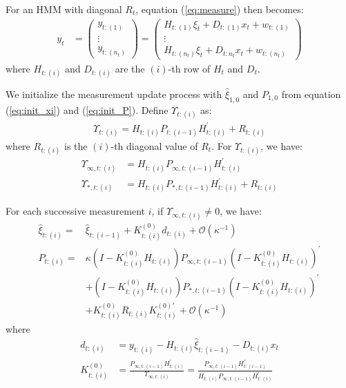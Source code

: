 \documentclass[12pt]{article}
\numberwithin{equation}{section}
\begin{document}
For an HMM with diagonal $R_t$, equation (\ref{eq:measure}) then becomes:
\begin{align*}
    y_t &= 
    \begin{pmatrix}
        y_{t:(1)} \\
        \vdots \\ 
        y_{t:(n_t)}
    \end{pmatrix} 
    = \begin{pmatrix}
        H_{t:(1)}\xi_t + D_{t:(1)}x_t + w_{t:(1)} \\
        \vdots \\
        H_{t:(n_t)}\xi_t + D_{t:n_t}x_t + w_{t:(n_t)}
    \end{pmatrix}
\end{align*}
where $H_{t:(i)}$ and $D_{t:(i)}$ are the $(i)$-th row of $H_t$ and $D_t$. 

We initialize the measurement update process with $\hat{\xi}_{1,0}$ and $P_{1,0}$ from equation (\ref{eq:init_xi}) and (\ref{eq:init_P}). Define $\Upsilon_{t:(i)}$ as:
\begin{align*}
    \Upsilon_{t:(i)} = H_{t:(i)}P_{t:(i-1)}H_{t:(i)}^{'} + R_{t:(i)}
\end{align*}
where $R_{t:(i)}$ is the $(i)$-th diagonal value of $R_{t}$. For $\Upsilon_{t:(i)}$, we have:
\begin{align*}
    \Upsilon_{\infty, t:(i)} &= H_{t:(i)}P_{\infty, t:(i-1)}H_{t:(i)}^{'} \\
    \Upsilon_{*,t:(i)} &= H_{t:(i)}P_{*,t:(i-1)}H_{t:(i)}^{'} + R_{t:(i)}
\end{align*}

For each successive measurement $i$, if $\Upsilon_{\infty,t:(i)}\neq0$, we have:
\begin{align}
    \hat{\xi}_{t:(i)} = & \hat{\xi}_{t:(i-1)} + K_{t:(i)}^{(0)}d_{t:(i)} + \mathcal{O}(\kappa^{-1}) \label{eq:diff_seq_xi1} \\
    P_{t:(i)} =& \kappa(I-K_{t:(i)}^{(0)}H_{t:(i)})P_{\infty,t:(i-1)}(I-K_{t:(i)}^{(0)}H_{t:(i)})^{'} \label{eq:diff_seq_P1} \\
        & + (I-K_{t:(i)}^{(0)}H_{t:(i)})P_{*,t:(i-1)}(I-K_{t:(i)}^{(0)}H_{t:(i)})^{'} \nonumber \\
        & + K_{t:(i)}^{(0)}R_{t:(i)}K_{t:(i)}^{(0)'} + \mathcal{O}(\kappa^{-1}) \nonumber
\end{align}
where
\begin{align*}
    d_{t:(i)} &= y_{t:(i)} - H_{t:(i)}\hat{\xi}_{t:(i-1)}-D_{t:(i)}x_t \\
    K_{t:(i)}^{(0)} &= \frac{P_{\infty,t:(i-1)}H_{t:(i)}^{'}}{\Upsilon_{\infty,t:(i)}} 
        =\frac{P_{\infty,t:(i-1)}H_{t:(i-1)}^{'}}{H_{t:(i)}P_{\infty, t:(i-1)}H_{t:(i)}^{'}}
\end{align*}
\end{document}
